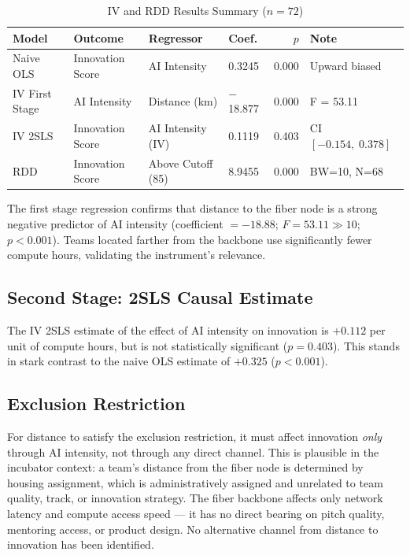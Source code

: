 \documentclass[12pt]{article}
\begin{document}
\begin{table}[H]
\centering
\caption{IV and RDD Results Summary ($n = 72$)}
\label{tab:results}
\begin{tabular}{llllrl}
\toprule
\textbf{Model} & \textbf{Outcome} & \textbf{Regressor}
    & \textbf{Coef.} & \textbf{$p$} & \textbf{Note} \\
\midrule
Naive OLS      & Innovation Score & AI Intensity        & 0.3245 & 0.000 & Upward biased \\
IV First Stage & AI Intensity     & Distance (km)       & $-$18.877 & 0.000 & F = 53.11 \\
IV 2SLS        & Innovation Score & AI Intensity (IV)   & 0.1119 & 0.403 & CI $[-0.154,\;0.378]$ \\
RDD            & Innovation Score & Above Cutoff (85)   & 8.9455 & 0.000 & BW=10, N=68 \\
\bottomrule
\end{tabular}
\end{table}

The first stage regression confirms that distance to the fiber node is a strong negative
predictor of AI intensity (coefficient $= -18.88$; $F = 53.11 \gg 10$; $p < 0.001$).
Teams located farther from the backbone use significantly fewer compute hours, validating
the instrument's relevance.

\subsection{Second Stage: 2SLS Causal Estimate}

The IV 2SLS estimate of the effect of AI intensity on innovation is $+0.112$ per unit
of compute hours, but is not statistically significant ($p = 0.403$). This stands in
stark contrast to the naive OLS estimate of $+0.325$ ($p < 0.001$).

\subsection{Exclusion Restriction}

For distance to satisfy the exclusion restriction, it must affect innovation \emph{only}
through AI intensity, not through any direct channel. This is plausible in the incubator
context: a team's distance from the fiber node is determined by housing assignment, which
is administratively assigned and unrelated to team quality, track, or innovation strategy.
The fiber backbone affects only network latency and compute access speed --- it has no
direct bearing on pitch quality, mentoring access, or product design. No alternative
channel from distance to innovation has been identified.
\end{document}
